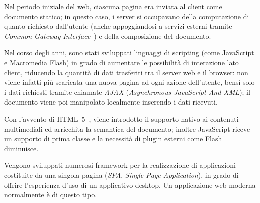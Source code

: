   Nel periodo iniziale del web, ciascuna pagina era inviata al client come documento statico;
  in questo caso, i server si occupavano della computazione di quanto richiesto dall'utente (anche appoggiandosi a servizi esterni tramite \emph{Common Gateway Interface}~\cite{Coar2004}) e della composizione del documento.

  Nel corso degli anni, sono stati sviluppati linguaggi di scripting (come JavaScript e Macromedia Flash) in grado di aumentare le possibilità di interazione lato client, riducendo la quantità di dati trasferiti tra il server web e il browser:
  non viene infatti più scaricata una nuova pagina ad ogni azione dell'utente, bensì solo i dati richiesti tramite chiamate \emph{AJAX} (\emph{Asynchronous JavaScript And XML});
  il documento viene poi manipolato localmente inserendo i dati ricevuti.

  Con l'avvento di HTML~5~\cite{Smith2008}, viene introdotto il supporto nativo ai contenuti multimediali ed arricchita la semantica del documento;
  inoltre JavaScript riceve un supporto di prima classe e la necessità di plugin esterni come Flash diminuisce.

  Vengono sviluppati numerosi framework per la realizzazione di applicazioni costituite da una singola pagina (\emph{SPA}, \emph{Single-Page Application}), in grado di offrire l'esperienza d'uso di un applicativo desktop.
  Un applicazione web moderna normalmente è di questo tipo.





